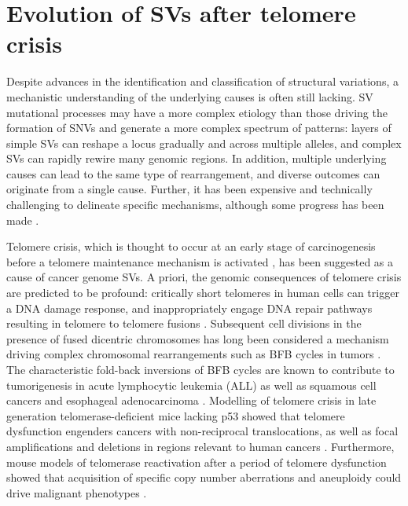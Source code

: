 \documentclass[phd,tocprelim]{cornell}
\begin{document}
\section{Evolution of SVs after telomere crisis}
Despite advances in the identification and classification of structural variations, a mechanistic understanding of the underlying causes is often still lacking. SV mutational processes may have a more complex etiology than those driving the formation of SNVs and generate a more complex spectrum of patterns: layers of simple SVs can reshape a locus gradually and across multiple alleles, and complex SVs can rapidly rewire many genomic regions. In addition, multiple underlying causes can lead to the same type of rearrangement, and diverse outcomes can originate from a single cause. Further, it has been expensive and technically challenging to delineate specific mechanisms, although some progress has been made \cite{Zhang2015-np,Willis2017-bw,Maciejowski2015-wx,Ly2019-bt,Ghezraoui2014-dt,Umbreit2020-kr}.

Telomere crisis, which is thought to occur at an early stage of carcinogenesis before a telomere maintenance mechanism is activated \cite{Shay2005-fb}, has been suggested as a cause of cancer genome SVs. A priori, the genomic consequences of telomere crisis are predicted to be profound: critically short telomeres in human cells can trigger a DNA damage response, and inappropriately engage DNA repair pathways resulting in telomere to telomere fusions \cite{Artandi2000-ab,Maciejowski2017-kx}. Subsequent cell divisions in the presence of fused dicentric chromosomes has long been considered a mechanism driving complex chromosomal rearrangements such as BFB cycles in tumors \cite{McClintock1939-oi,Gisselsson2001-hq}. The characteristic fold-back inversions of BFB cycles are known to contribute to tumorigenesis in acute lymphocytic leukemia (ALL) \cite{Li2014-mj} as well as squamous cell cancers and esophageal adenocarcinoma \cite{Hadi2020-um}. Modelling of telomere crisis in late generation telomerase-deficient mice lacking p53 showed that telomere dysfunction engenders cancers with non-reciprocal translocations, as well as focal amplifications and deletions in regions relevant to human cancers \cite{Artandi2000-ab,OHagan2002-rg}. Furthermore, mouse models of telomerase reactivation after a period of telomere dysfunction showed that acquisition of specific copy number aberrations and aneuploidy could drive malignant phenotypes \cite{Ding2012-at}.
\end{document}

